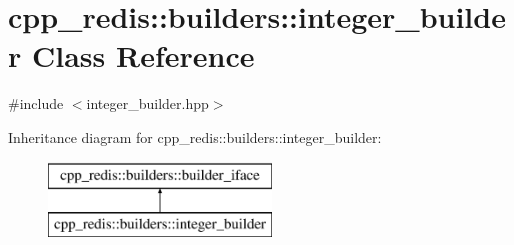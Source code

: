 \hypertarget{classcpp__redis_1_1builders_1_1integer__builder}{}\section{cpp\+\_\+redis\+:\+:builders\+:\+:integer\+\_\+builder Class Reference}
\label{classcpp__redis_1_1builders_1_1integer__builder}


{\ttfamily \#include $<$integer\+\_\+builder.\+hpp$>$}

Inheritance diagram for cpp\+\_\+redis\+:\+:builders\+:\+:integer\+\_\+builder\+:\begin{figure}[H]
\begin{center}
\leavevmode
\includegraphics[height=2.000000cm]{classcpp__redis_1_1builders_1_1integer__builder}
\end{center}
\end{figure}

